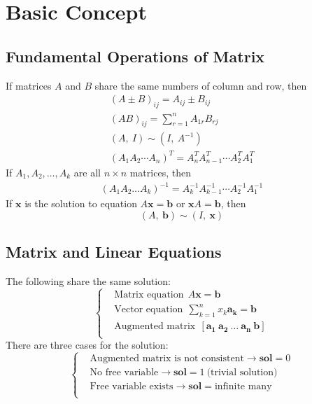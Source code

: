 \documentclass[11pt]{article}
\begin{document}
\section{Basic Concept}
\subsection{Fundamental Operations of Matrix}
If matrices $A$ and $B$ share the same numbers of column and row, then
\begin{gather}
    (A \pm B)_{ij} = A_{ij} \pm  B_{ij}\\
    (A B)_{ij} = \sum_{r=1}^{n}A_{1r}B_{rj} \\
    (A,~I) \sim (I,~A^{-1}) \\
    (A_1A_2\cdots A_n)^{T} = A_n^TA_{n-1}^T\cdots A_2^{T}A_1^{T}
\end{gather}
If $A_1,A_2,\dots,A_k$ are all $n \times n $ matrices, then
\begin{gather}
    (A_1A_2\dots A_k)^{-1} = A_k^{-1}A_{k-1}^{-1}\cdots A_2^{-1}A_1^{-1}
\end{gather}
If $\bm{x}$ is the solution to equation $A\bm{x} = \bm{b}$ or $\bm{x}A = \bm{b}$, then
\begin{equation}
    (A,~\bm{b}) \sim (I,~\bm{x})
\end{equation}
\subsection{Matrix and Linear Equations}
The following share the same solution:
\begin{equation}
\left\{
\begin{aligned}
    &\text{Matrix equation}~~A\bm{x}=\bm{b}\\
    &\text{Vector equation}~~\sum_{k=1}^{n}x_k\bm{a_k}=\bm{b}\\
    &\text{Augmented matrix}~~[\bm{a_1}~\bm{a_2}~\dots~\bm{a_n}~\bm{b}]\\
\end{aligned}
\right.
\end{equation}
There are three cases for the solution:
\begin{equation}
\left\{
\begin{aligned}
    &\text{Augmented matrix is not consistent} \rightarrow \bm{sol} = 0\\
    &\text{No free variable} \rightarrow \bm{sol} = 1~\text{(trivial solution)}\\
    &\text{Free variable exists} \rightarrow \bm{sol} = \text{infinite many}\\
\end{aligned}
\right.
\end{equation}
\end{document}
